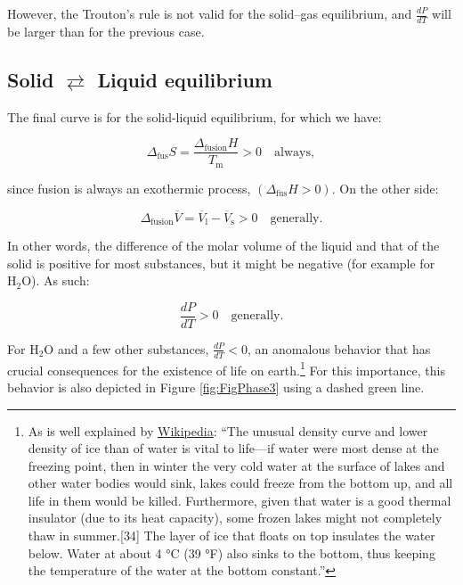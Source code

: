 \documentclass[
  9pt,
]{extbook}
\theoremstyle{definition}
\theoremstyle{definition}
\theoremstyle{definition}
\theoremstyle{remark}
\begin{document}
However, the Trouton's rule is not valid for the solid--gas equilibrium, and \(\frac{dP}{dT}\) will be larger than for the previous case.

\hypertarget{solid-rightleftarrows-liquid-equilibrium}{%
\subsection{\texorpdfstring{Solid \(\rightleftarrows\) Liquid equilibrium}{Solid \textbackslash rightleftarrows Liquid equilibrium}}\label{solid-rightleftarrows-liquid-equilibrium}}

The final curve is for the solid-liquid equilibrium, for which we have:

\begin{equation}
\Delta_{\text{fus}} S = \frac{\Delta_{\text{fusion}} H}{T_{\text{m}}} > 0 \quad \text{always},
\label{eq:PTd1}
\end{equation}

since fusion is always an exothermic process, \((\Delta_{\text{fus}} H>0)\). On the other side:

\begin{equation}
\Delta_{\text{fusion}} \overline{V} = \overline{V}_{\text{l}} - \overline{V}_{\text{s}} > 0 \quad \text{generally}.
\end{equation}

In other words, the difference of the molar volume of the liquid and that of the solid is positive for most substances, but it might be negative (for example for \(\mathrm{H}_2\mathrm{O}\)). As such:

\begin{equation}
 \frac{dP}{dT} > 0 \quad \text{generally}.
\label{eq:PTd2}
\end{equation}

For \(\mathrm{H}_2\mathrm{O}\) and a few other substances, \(\frac{dP}{dT}<0\), an anomalous behavior that has crucial consequences for the existence of life on earth.\footnote{As is well explained by \href{https://en.wikipedia.org/wiki/Properties_of_water\#Density_of_water_and_ice}{Wikipedia}: ``The unusual density curve and lower density of ice than of water is vital to life---if water were most dense at the freezing point, then in winter the very cold water at the surface of lakes and other water bodies would sink, lakes could freeze from the bottom up, and all life in them would be killed. Furthermore, given that water is a good thermal insulator (due to its heat capacity), some frozen lakes might not completely thaw in summer.{[}34{]} The layer of ice that floats on top insulates the water below. Water at about 4 °C (39 °F) also sinks to the bottom, thus keeping the temperature of the water at the bottom constant.''} For this importance, this behavior is also depicted in Figure \ref{fig:FigPhase3} using a dashed green line.
\end{document}
